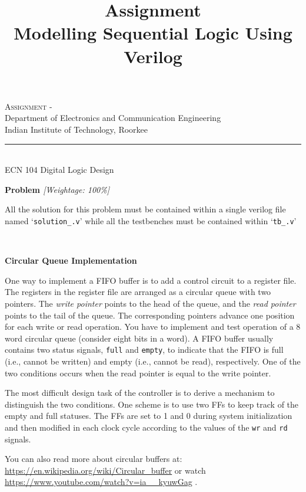 \documentclass[a4paper,10pt]{article}
\newcommand{\linia}{\rule{\linewidth}{0.5pt}}
\newcommand{\ano}{\text{3}}
\theoremstyle{mytheor}
\newcommand{\antitle}{\text{}}
\renewcommand{\maketitle}{
\begin{center}
\vspace{2ex}
{\huge \textsc{{{\large}Assignment - \ano}\vspace{0.1cm} \break \antitle}}
\vspace{1ex}
\\

Department of Electronics and Communication Engineering \\
Indian Institute of Technology, Roorkee
\linia\\
ECN 104 \hfill Digital Logic Design
\vspace{4ex}
\end{center}
}
\renewcommand\familydefault{\sfdefault}
\newcounter{problemNumber}
\newcommand {
  \insertProblem}[2]{
  
  {
    \setlength{\parindent}{0}

    {
      \color{greatblue}
      \textbf{\Large{Problem \theproblemNumber}}
      \hfill
      \textit{[Weightage: #1]}
    }

    {
      \centering
      \begin{center}
        \lfseries \footnotesize All the solution for this problem
        must be contained within a single verilog file named
        `\texttt{solution\_\theproblemNumber.v}' while all the
        testbenches must be contained within
          `\texttt{tb\_\theproblemNumber.v}'
        \end{center}
      }
      
    }
    
  \vspace{6pt}\\#2

  \addtocounter{problemNumber}{1}
}
\newcommand{\problemheading}[1] {
  \vspace{0.3cm}

  {
    \setlength{\parindent}{0}
    \textbf{#1}
  }

  \vspace{0.05cm}
}
\newcounter{hintCount} %
\newcommand{\hintcounter}[1]{%
  \refstepcounter{hintCount}%
  \thehintCount%
  \label{#1}}%
\newcounter{hintcnt}
\newcommand{\hint}[2] {
  \begin{tcolorbox}[arc=1pt,colback=blue!5!white,colframe=blue!75!black,title=\textbf{Hint - \hintcounter{#1}}]  
    #2
  \end{tcolorbox}
  \addtocounter{hintcnt}{1}
}
\newcommand{\inlinev}[1]{\lstinline[style=verilog-inline-style]{#1}}
\newcommand{\amurl}[1]{%
  {\color{blue}\url{#1}}
}
\begin{document}
\renewcommand\familydefault{\sfdefault}
\renewcommand*\familydefault{\sfdefault} 


\title{Assignment \ano \\ Modelling Sequential Logic Using Verilog}

\maketitle

\insertProblem {100\%} { \problemheading{Circular Queue
    Implementation} One way to implement a FIFO buffer is to add a
  control circuit to a register file. The registers in the register
  file are arranged as a circular queue with two pointers. The
  \emph{write pointer} points to the head of the queue, and the
  \emph{read pointer} points to the tail of the queue. The
  corresponding pointers advance one position for each write or read
  operation. You have to implement and test operation of a 8 word
  circular queue (consider eight bits in a word).  A FIFO buffer
  usually contains two status signals, \inlinev{full} and
  \inlinev{empty}, to indicate that the FIFO is full (i.e., cannot be
  written) and empty (i.e., cannot be read), respectively. One of the
  two conditions occurs when the read pointer is equal to the write
  pointer.

  \hint{}{The most difficult design task of the controller is to
    derive a mechanism to distinguish the two conditions. One scheme
    is to use two FFs to keep track of the empty and full
    statuses. The FFs are set to 1 and 0 during system initialization
    and then modified in each clock cycle according to the values of
    the \inlinev{wr} and \inlinev{rd} signals.

    You can also read more about circular buffers at:
    \amurl{https://en.wikipedia.org/wiki/Circular_buffer} or watch
    \amurl{https://www.youtube.com/watch?v=ia__kyuwGag}.
    
  }
  
}
\end{document}

